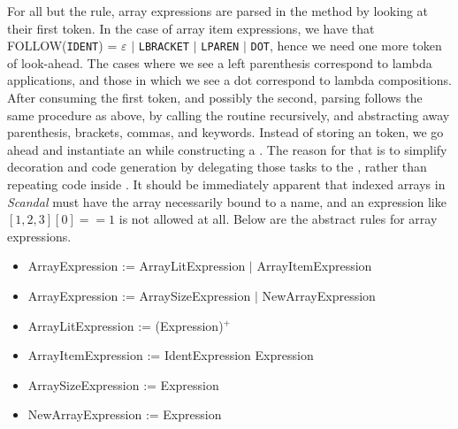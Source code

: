For all but the  rule, array expressions are parsed in the  method by looking at their first token. In the case of array item expressions, we have that FOLLOW(\texttt{IDENT}) = $\varepsilon$ $|$ \texttt{LBRACKET} $|$ \texttt{LPAREN} $|$ \texttt{DOT}, hence we need one more token of look-ahead. The cases where we see a left parenthesis correspond to lambda applications, and those in which we see a dot correspond to lambda compositions. After consuming the first token, and possibly the second, parsing follows the same procedure as above, by calling the  routine recursively, and abstracting away parenthesis, brackets, commas, and keywords. Instead of storing an  token, we go ahead and instantiate an  while constructing a . The reason for that is to simplify decoration and code generation by delegating those tasks to the , rather than repeating code inside . It should be immediately apparent that indexed arrays in \emph{Scandal} must have the array necessarily bound to a name, and an expression like $[1, 2, 3][0] == 1$ is not allowed at all. Below are the abstract rules for array expressions.

\begin{itemize}
	\item ArrayExpression := ArrayLitExpression $|$ ArrayItemExpression
	\item ArrayExpression := ArraySizeExpression $|$ NewArrayExpression
	\item ArrayLitExpression := (Expression)$^+$
	\item ArrayItemExpression := IdentExpression Expression
	\item ArraySizeExpression := Expression
	\item NewArrayExpression := Expression
\end{itemize}

